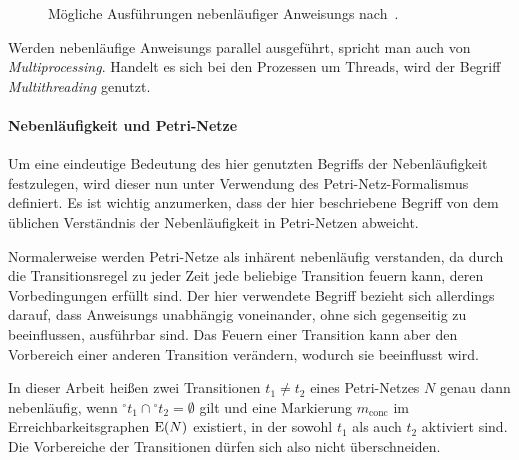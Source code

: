 \begin{figure}[hbt]
\begin{subfigure}{\textwidth}
\end{subfigure}

\caption[Mögliche Ausführungen nebenläufiger .]{Mögliche Ausführungen nebenläufiger \glspl{Anweisung} nach~\cite{Herrtwich1989}.}\label{fig:concAnweisungen}
\end{figure}

Werden nebenläufige \glspl{Anweisung} parallel ausgeführt, spricht man auch von \emph{Multiprocessing}. Handelt es sich bei den Prozessen um Threads, wird der Begriff \emph{Multithreading} genutzt.

\paragraph{Nebenläufigkeit und Petri-Netze}
Um eine eindeutige Bedeutung des hier genutzten Begriffs der Nebenläufigkeit festzulegen, wird dieser nun unter Verwendung des Petri-Netz-Formalismus definiert. Es ist wichtig anzumerken, dass der hier beschriebene Begriff von dem üblichen Verständnis der Nebenläufigkeit in Petri-Netzen abweicht. 

Normalerweise werden Petri-Netze als inhärent nebenläufig verstanden, da durch die Transitionsregel zu jeder Zeit jede beliebige Transition feuern kann, deren Vorbedingungen erfüllt sind. Der hier verwendete Begriff bezieht sich allerdings darauf, dass \glspl{Anweisung} unabhängig voneinander, ohne sich gegenseitig zu beeinflussen, ausführbar sind. Das Feuern einer Transition kann aber den Vorbereich einer anderen Transition verändern, wodurch sie beeinflusst wird.

In dieser Arbeit heißen zwei Transitionen $t_1 \neq t_2$ eines Petri-Netzes $N$ genau dann nebenläufig, wenn ${}^\circ t_1 \cap {}^\circ t_2 = \emptyset$ gilt und eine Markierung $m_\text{conc}$ im Erreichbarkeitsgraphen $\operatorname{E}(N)$ existiert, in der sowohl $t_1$ als auch $t_2$ aktiviert sind. Die Vorbereiche der Transitionen dürfen sich also nicht überschneiden.

